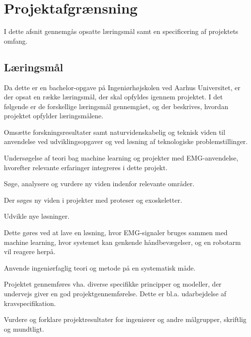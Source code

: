 \thispagestyle{fancy}
\chapter{Projektafgrænsning}
\label{chp:projektafgraensning}
I dette afsnit gennemgås opsatte læringsmål samt en specificering af projektets omfang. 
\section{Læringsmål}
Da dette er en bachelor-opgave på Ingeniørhøjskolen ved Aarhus Universitet, er der opsat en række læringsmål, der skal opfyldes igennem projektet. I det følgende er de forskellige læringsmål gennemgået, og der beskrives, hvordan projektet opfylder læringsmålene.
\begin{myItemize}
	\item Omsætte forskningsresultater samt naturvidenskabelig og teknisk viden til anvendelse ved udviklingsopgaver og ved løsning af teknologiske problemstillinger.
	\begin{myItemize}
		\item Undersøgelse af teori bag machine learning og projekter med EMG-anvendelse, hvorefter relevante erfaringer integreres i dette projekt.
	\end{myItemize}
	\item Søge, analysere og vurdere ny viden indenfor relevante områder.
	\begin{myItemize}
		\item Der søges ny viden i projekter med proteser og exoskeletter. 
	\end{myItemize}
	\item Udvikle nye løsninger.
	\begin{myItemize}
		\item Dette gøres ved at lave en løsning, hvor EMG-signaler bruges sammen med machine learning, hvor systemet kan genkende håndbevægelser, og en robotarm vil reagere herpå.
	\end{myItemize}
	\item Anvende ingeniørfaglig teori og metode på en systematisk måde.
	\begin{myItemize}
		\item Projektet gennemføres vha. diverse specifikke principper og modeller, der undervejs giver en god projektgennemførelse. Dette er bl.a. udarbejdelse af kravspecifikation.
	\end{myItemize}
	\item Vurdere og forklare projektresultater for ingeniører og andre målgrupper, skriftlig og mundtligt.

\end{myItemize}
